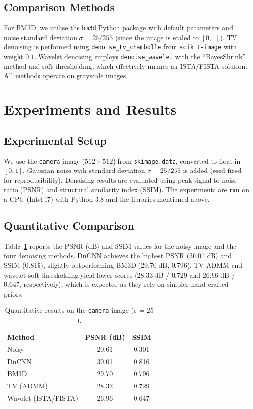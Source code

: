 \documentclass[twocolumn]{article}
\begin{document}
\subsection{Comparison Methods}
For BM3D, we utilise the \texttt{bm3d} Python package with default parameters and noise standard deviation $\sigma=25/255$ (since the image is scaled to $[0,1]$). TV denoising is performed using \texttt{denoise\_tv\_chambolle} from \texttt{scikit-image} with weight $0.1$. Wavelet denoising employs \texttt{denoise\_wavelet} with the ``BayesShrink'' method and soft thresholding, which effectively mimics an ISTA/FISTA solution. All methods operate on grayscale images.

\section{Experiments and Results}
\subsection{Experimental Setup}
We use the \texttt{camera} image ($512\times512$) from \texttt{skimage.data}, converted to float in $[0,1]$. Gaussian noise with standard deviation $\sigma=25/255$ is added (seed fixed for reproducibility). Denoising results are evaluated using peak signal-to-noise ratio (PSNR) and structural similarity index (SSIM). The experiments are run on a CPU (Intel i7) with Python 3.8 and the libraries mentioned above.

\subsection{Quantitative Comparison}
Table~\ref{tab:metrics} reports the PSNR (dB) and SSIM values for the noisy image and the four denoising methods. DnCNN achieves the highest PSNR (30.01 dB) and SSIM (0.816), slightly outperforming BM3D (29.70 dB, 0.796). TV-ADMM and wavelet soft-thresholding yield lower scores (28.33 dB / 0.729 and 26.96 dB / 0.647, respectively), which is expected as they rely on simpler hand-crafted priors.

\begin{table}[h]
\centering
\caption{Quantitative results on the \texttt{camera} image ($\sigma=25$).}
\label{tab:metrics}
\begin{tabular}{lcc}
\toprule
Method & PSNR (dB) & SSIM \\
\midrule
Noisy          & 20.61 & 0.301 \\
DnCNN          & 30.01 & 0.816 \\
BM3D           & 29.70 & 0.796 \\
TV (ADMM)      & 28.33 & 0.729 \\
Wavelet (ISTA/FISTA) & 26.96 & 0.647 \\
\bottomrule
\end{tabular}
\end{table}
\end{document}
